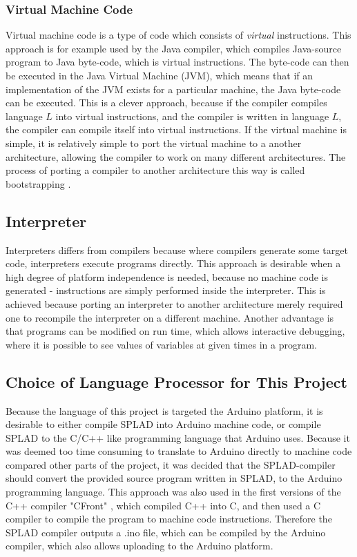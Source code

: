 \subsubsection*{Virtual Machine Code} 
Virtual machine code is a type of code which consists of \emph{virtual} instructions. This approach is for example used by the Java compiler, which compiles Java-source program to Java byte-code, which is virtual instructions. The byte-code can then be executed in the Java Virtual Machine (JVM), which means that if an implementation of the JVM exists for a particular machine, the Java byte-code can be executed. This is a clever approach, because if the compiler compiles language $L$ into virtual instructions, and the compiler is written in language $L$, the compiler can compile itself into virtual instructions. If the virtual machine is simple, it is relatively simple to port the virtual machine to a another architecture, allowing the compiler to work on many different architectures. The process of porting a compiler to another architecture this way is called bootstrapping \citep{CraftingACompiler}. 

\subsection{Interpreter}
Interpreters differs from compilers because where compilers generate some target code, interpreters execute programs directly. This approach is desirable when a high degree of platform independence is needed, because no machine code is generated - instructions are simply performed inside the interpreter. This is achieved because porting an interpreter to another architecture merely required one to recompile the interpreter on a different machine. Another advantage is that programs can be modified on run time, which allows interactive debugging, where it is possible to see values of variables at given times in a program. 

\subsection{Choice of Language Processor for This Project}
Because the language of this project is targeted the Arduino platform, it is desirable to either compile SPLAD into Arduino machine code, or compile SPLAD to the C/C++ like programming language that Arduino uses. Because it was deemed too time consuming to translate to Arduino directly to machine code compared other parts of the project, it was decided that the SPLAD-compiler should convert the provided source program written in SPLAD, to the Arduino programming language. This approach was also used in the first versions of the C++ compiler "CFront" \citep{sebesta}, which compiled C++ into C, and then used a C compiler to compile the program to machine code instructions. Therefore the SPLAD compiler outputs a .ino file, which can be compiled by the Arduino compiler, which also allows uploading to the Arduino platform. 